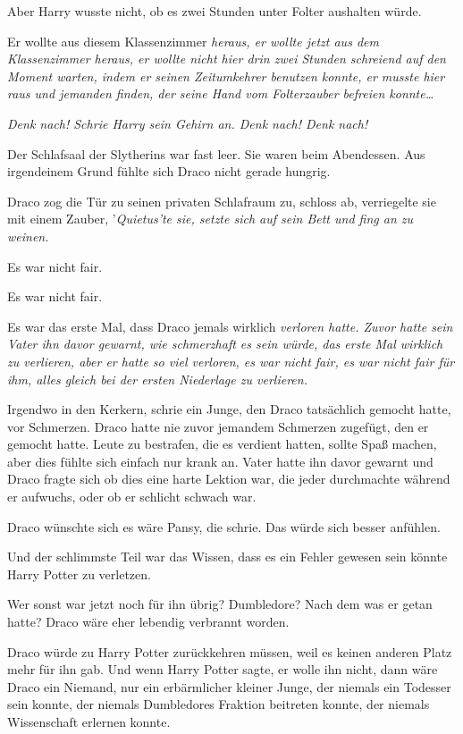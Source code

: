 {Aber Harry wusste nicht, ob es zwei Stunden unter Folter aushalten würde.

Er wollte aus diesem Klassenzimmer \emph{heraus, er wollte \emph{jetzt} aus dem Klassenzimmer heraus, er wollte nicht hier drin zwei Stunden schreiend auf den Moment warten, indem er seinen Zeitumkehrer benutzen konnte, er musste \emph{hier raus} und jemanden finden, der seine Hand vom Folterzauber befreien konnte…}

\emph{Denk nach! Schrie Harry sein Gehirn an. Denk nach! Denk nach!}

Der Schlafsaal der Slytherins war fast leer. Sie waren beim Abendessen. Aus irgendeinem Grund fühlte sich Draco nicht gerade hungrig.

Draco zog die Tür zu seinen privaten Schlafraum zu, schloss ab, verriegelte sie mit einem Zauber, '\emph{Quietus'te sie, setzte sich auf sein Bett und fing an zu weinen.}

Es war nicht fair.

Es war nicht fair.

Es war das erste Mal, dass Draco jemals wirklich \emph{verloren hatte. Zuvor hatte sein Vater ihn davor gewarnt, wie schmerzhaft es sein würde, das erste Mal wirklich zu verlieren, aber er hatte \emph{so viel} verloren, es war nicht fair, es war nicht fair für ihm, \emph{alles} gleich bei der ersten Niederlage zu verlieren.}

Irgendwo in den Kerkern, schrie ein Junge, den Draco tatsächlich gemocht hatte, vor Schmerzen. Draco hatte nie zuvor jemandem Schmerzen zugefügt, den er gemocht hatte. Leute zu bestrafen, die es verdient hatten, sollte Spaß machen, aber dies fühlte sich einfach nur krank an. Vater hatte ihn davor gewarnt und Draco fragte sich ob dies eine harte Lektion war, die jeder durchmachte während er aufwuchs, oder ob er schlicht schwach war.

Draco wünschte sich es wäre Pansy, die schrie. Das würde sich besser anfühlen.

Und der schlimmste Teil war das Wissen, dass es ein Fehler gewesen sein könnte Harry Potter zu verletzen.

Wer sonst war jetzt noch für ihn übrig? Dumbledore? Nach dem was er getan hatte? Draco wäre eher lebendig verbrannt worden.

Draco würde zu Harry Potter zurückkehren müssen, weil es keinen anderen Platz mehr für ihn gab. Und wenn Harry Potter sagte, er wolle ihn nicht, dann wäre Draco ein Niemand, nur ein erbärmlicher kleiner Junge, der niemals ein Todesser sein konnte, der niemals Dumbledores Fraktion beitreten konnte, der niemals Wissenschaft erlernen konnte.

}
